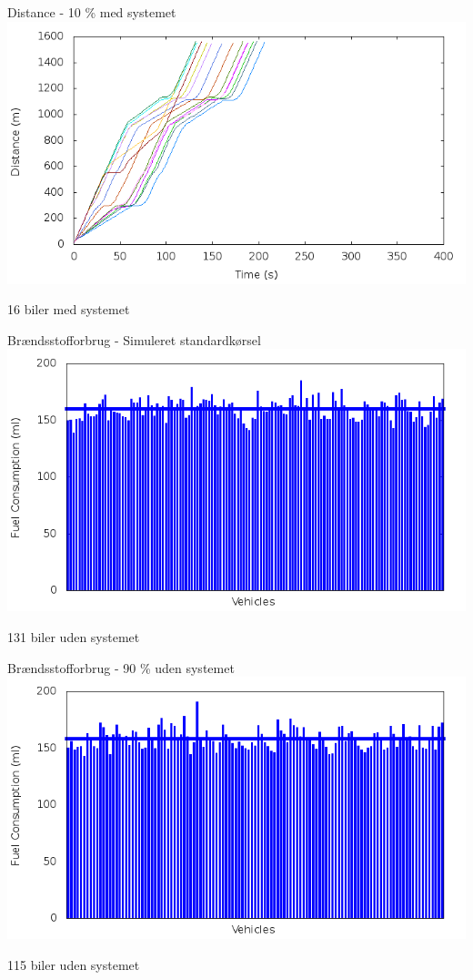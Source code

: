 \begin{frame}{Distance - 10 \% med systemet}
\includegraphics[width=1\textwidth]{../images/tp0/distanceControlled10.png}

16 biler med systemet
\end{frame}

\begin{frame}{Brændsstofforbrug - Simuleret standardkørsel}
\includegraphics[width=1\textwidth]{../images/tp0/fuelRouteUncontrolled0.png}

131 biler uden systemet
\end{frame}


\begin{frame}{Brændsstofforbrug - 90 \% uden systemet}
\includegraphics[width=1\textwidth]{../images/tp0/fuelRouteUncontrolled10.png}

115 biler uden systemet
\end{frame}

